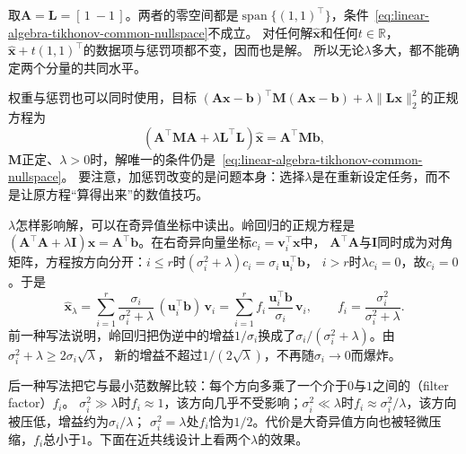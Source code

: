 \begin{example}[反例：惩罚无法确定的方向]
\label{ex:ls-tikhonov-common-nullspace}
取$\bm A=\bm L=[\,1\ -1\,]$。两者的零空间都是$\operatorname{span}\{(1,1)^\top\}$，条件~\eqref{eq:linear-algebra-tikhonov-common-nullspace}不成立。
对任何解$\hat{\bm x}$和任何$t\in\mathbb R$，$\hat{\bm x}+t(1,1)^\top$的数据项与惩罚项都不变，因而也是解。
所以无论$\lambda$多大，都不能确定两个分量的共同水平。
\end{example}

权重与惩罚也可以同时使用，目标
$(\bm A\bm x-\bm b)^\top\bm M(\bm A\bm x-\bm b)+\lambda\lVert\bm L\bm x\rVert_2^2$的正规方程为
\begin{equation}
 (\bm A^\top\bm M\bm A+\lambda\bm L^\top\bm L)\hat{\bm x}=\bm A^\top\bm M\bm b,
 \label{eq:ls-general-normal-equations}
\end{equation}
$\bm M$正定、$\lambda>0$时，解唯一的条件仍是~\eqref{eq:linear-algebra-tikhonov-common-nullspace}。
要注意，加惩罚改变的是问题本身：选择$\lambda$是在重新设定任务，而不是让原方程“算得出来”的数值技巧。

$\lambda$怎样影响解，可以在奇异值坐标中读出。岭回归的正规方程是$(\bm A^\top\bm A+\lambda\bm I)\bm x=\bm A^\top\bm b$。在右奇异向量坐标$c_i=\bm v_i^\top\bm x$中，
$\bm A^\top\bm A$与$\bm I$同时成为对角矩阵，方程按方向分开：$i\leq r$时$(\sigma_i^2+\lambda)c_i=\sigma_i\,\bm u_i^\top\bm b$，
$i>r$时$\lambda c_i=0$，故$c_i=0$。于是
\begin{equation}
 \hat{\bm x}_\lambda=\sum_{i=1}^r\frac{\sigma_i}{\sigma_i^2+\lambda}\,(\bm u_i^\top\bm b)\,\bm v_i
 =\sum_{i=1}^r f_i\,\frac{\bm u_i^\top\bm b}{\sigma_i}\,\bm v_i,
 \qquad f_i=\frac{\sigma_i^2}{\sigma_i^2+\lambda}.
 \label{eq:matrix-analysis-ridge-filter-factor}
\end{equation}
前一种写法说明，岭回归把伪逆中的增益$1/\sigma_i$换成了$\sigma_i/(\sigma_i^2+\lambda)$。由$\sigma_i^2+\lambda\geq2\sigma_i\sqrt\lambda$，
新的增益不超过$1/(2\sqrt\lambda)$，不再随$\sigma_i\to0$而爆炸。

后一种写法把它与最小范数解比较：每个方向多乘了一个介于$0$与$1$之间的（filter factor）$f_i$。
$\sigma_i^2\gg\lambda$时$f_i\approx1$，该方向几乎不受影响；$\sigma_i^2\ll\lambda$时$f_i\approx\sigma_i^2/\lambda$，该方向被压低，增益约为$\sigma_i/\lambda$；
$\sigma_i^2=\lambda$处$f_i$恰为$1/2$。代价是大奇异值方向也被轻微压缩，$f_i$总小于$1$。下面在近共线设计上看两个$\lambda$的效果。

